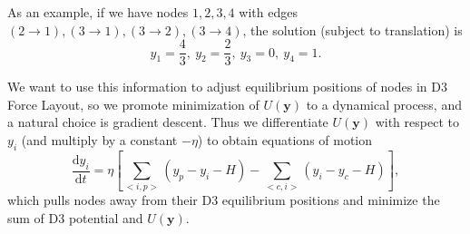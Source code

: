 \documentclass{acm_proc_article-sp}
\begin{document}
As an example, if we have nodes $1,2,3,4$ with edges 
$(2 \rightarrow 1), (3 \rightarrow 1), (3 \rightarrow 2), (3 \rightarrow 4)$,
the solution (subject to translation) is
$$y_1=\frac43,~y_2=\frac23,~y_3=0,~y_4=1.$$

We want to use this information to adjust equilibrium positions of nodes in D3 Force Layout,
so we promote minimization of $U(\mathbf{y})$ to a dynamical process,
and a natural choice is gradient descent.
Thus we differentiate $U(\mathbf{y})$ with respect to $y_i$ (and multiply by a constant $-\eta$) to obtain equations of motion 
\begin{equation}
\frac{\mathrm{d}y_i}{\mathrm{d}t} = \eta
\left[
\sum_{<i,p>}\left(y_p-y_i-H\right)
-\sum_{<c,i>}\left(y_i-y_c-H\right)\right],
\end{equation}
which pulls nodes away from their D3 equilibrium positions and minimize the sum of D3 potential and $U(\mathbf{y})$.
\end{document}
